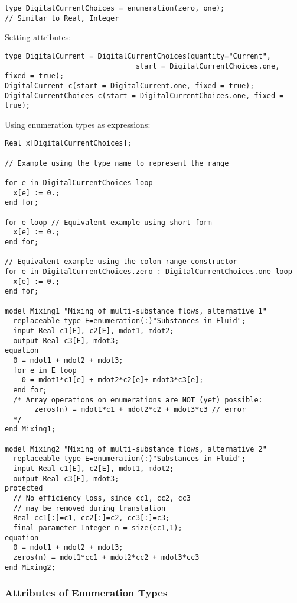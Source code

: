 \begin{example}
\begin{lstlisting}[language=modelica]
type DigitalCurrentChoices = enumeration(zero, one);
// Similar to Real, Integer
\end{lstlisting}

Setting attributes:
\begin{lstlisting}[language=modelica]
type DigitalCurrent = DigitalCurrentChoices(quantity="Current",
                               start = DigitalCurrentChoices.one, fixed = true);
DigitalCurrent c(start = DigitalCurrent.one, fixed = true);
DigitalCurrentChoices c(start = DigitalCurrentChoices.one, fixed = true);
\end{lstlisting}

Using enumeration types as expressions:
\begin{lstlisting}[language=modelica]
Real x[DigitalCurrentChoices];

// Example using the type name to represent the range

for e in DigitalCurrentChoices loop
  x[e] := 0.;
end for;

for e loop // Equivalent example using short form
  x[e] := 0.;
end for;

// Equivalent example using the colon range constructor
for e in DigitalCurrentChoices.zero : DigitalCurrentChoices.one loop
  x[e] := 0.;
end for;

model Mixing1 "Mixing of multi-substance flows, alternative 1"
  replaceable type E=enumeration(:)"Substances in Fluid";
  input Real c1[E], c2[E], mdot1, mdot2;
  output Real c3[E], mdot3;
equation
  0 = mdot1 + mdot2 + mdot3;
  for e in E loop
    0 = mdot1*c1[e] + mdot2*c2[e]+ mdot3*c3[e];
  end for;
  /* Array operations on enumerations are NOT (yet) possible:
       zeros(n) = mdot1*c1 + mdot2*c2 + mdot3*c3 // error
  */
end Mixing1;

model Mixing2 "Mixing of multi-substance flows, alternative 2"
  replaceable type E=enumeration(:)"Substances in Fluid";
  input Real c1[E], c2[E], mdot1, mdot2;
  output Real c3[E], mdot3;
protected
  // No efficiency loss, since cc1, cc2, cc3
  // may be removed during translation
  Real cc1[:]=c1, cc2[:]=c2, cc3[:]=c3;
  final parameter Integer n = size(cc1,1);
equation
  0 = mdot1 + mdot2 + mdot3;
  zeros(n) = mdot1*cc1 + mdot2*cc2 + mdot3*cc3
end Mixing2;
\end{lstlisting}
\end{example}

\subsubsection{Attributes of Enumeration Types}

